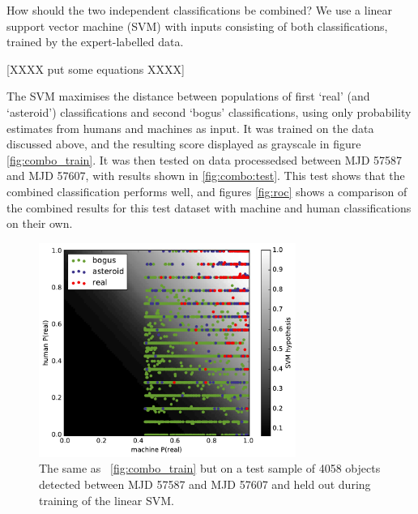 \documentclass[a4paper,fleqn,usenatbib]{mnras}
\begin{document}
How should the two independent classifications be combined? We use a linear support vector machine (SVM) with inputs consisting of both classifications, trained by the expert-labelled data. 

[XXXX put some equations XXXX]

The SVM  maximises the distance between populations of first `real' (and `asteroid') classifications and second `bogus' classifications, using only probability estimates from humans and machines as input. It was trained on the data discussed above, and the resulting score displayed as grayscale in figure \ref{fig:combo_train}. It was then tested on data processedsed between MJD 57587 and MJD 57607, with results shown in \ref{fig:combo:test}. This test shows that the combined classification performs well, and figures \ref{fig:roc} shows a comparison of the combined results for this test dataset with machine and human classifications on their own.


\begin{figure}
   \includegraphics[width=84mm]{figs/human_v_machine_test.pdf}
   \caption{The same as ~\ref{fig:combo_train} but on a test sample of 4058 objects detected between
            MJD 57587 and MJD 57607 and held out during training of the linear SVM.} 
   \label{fig:combo_test} 
\end{figure}
\end{document}

